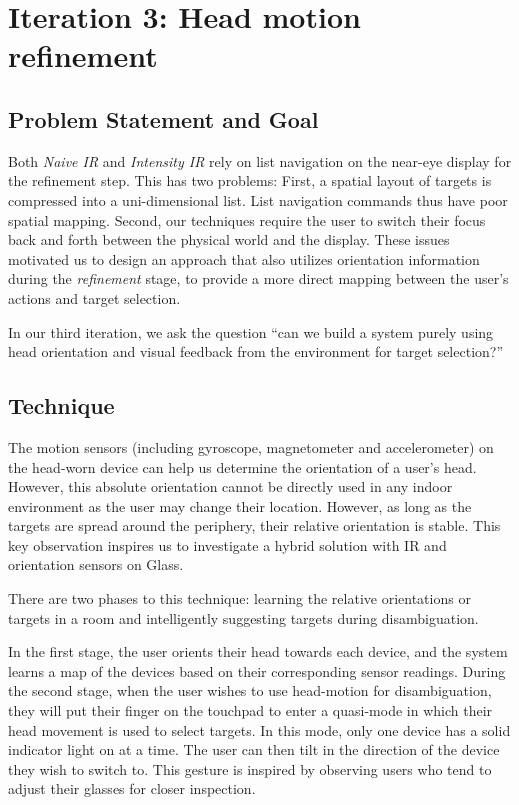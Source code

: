 \section{Iteration 3: Head motion refinement}
\label{sec:iteration-3:-head}
\subsection{Problem Statement and Goal}
Both {\em Naive IR} and {\em Intensity IR} rely on list navigation on the near-eye display for the refinement step. This has two problems: First, a spatial layout of targets is compressed into a uni-dimensional list. List navigation commands thus have poor spatial mapping. Second, our techniques require the user to switch their focus back and forth between the physical world and the display. These issues motivated us to design an approach that also utilizes orientation information during the {\em refinement} stage, to provide a more direct mapping between the user's actions and target selection.

In our third iteration, we ask the question ``can we build a system purely using head orientation and visual feedback from the environment for target selection?''

\subsection{Technique}
The motion sensors (including gyroscope, magnetometer and accelerometer) on the head-worn device can help us determine the orientation of a user's head. However, this absolute orientation cannot be directly used in any indoor environment as the user may change their location. However, as long as the targets are spread around the periphery, their relative orientation is stable. This key observation inspires us to investigate a hybrid solution with IR and orientation sensors on Glass.

There are two phases to this technique: learning the relative orientations or targets in a room and intelligently suggesting targets during disambiguation.

In the first stage, the user orients their head towards each device, and the system learns a map of the devices based on their corresponding sensor readings. During the second stage, when the user wishes to use head-motion for disambiguation, they will put their finger on the touchpad to enter a quasi-mode in which their head movement is used to select targets. In this mode, only one device has a solid indicator light on at a time.   The user can then tilt in the direction of the device they wish to switch to. This gesture is inspired by observing users who tend to adjust their glasses for closer inspection.

